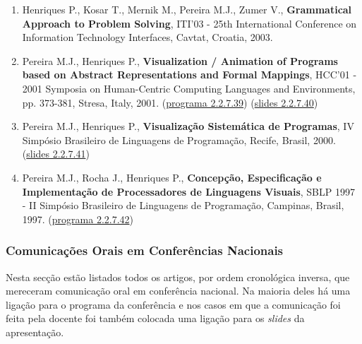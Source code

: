 \documentclass[11pt]{article}
\begin{document}
\begin{enumerate}
\item {Henriques P., Kosar T., Mernik M., Pereira M.J., Zumer V., {\bf{ Grammatical Approach to Problem Solving}}, ITI'03 - 25th International Conference on Information Technology Interfaces, Cavtat, Croatia, 2003.}

\item {Pereira M.J., Henriques P., {\bf{ Visualization / Animation of Programs based on Abstract Representations and Formal Mappings}}, HCC'01 - 2001 Symposia on Human-Centric Computing Languages and Environments, pp. 373-381, Stresa, Italy, 2001. (\href{run:ComunicacoesOrais/programas/HCC2001Program.pdf}{programa 2.2.7.39}) (\href{run:ComunicacoesOrais/HCC01apres.pdf}{slides 2.2.7.40})}

\item {Pereira M.J., Henriques P., {\bf{ Visualização Sistemática de Programas}}, IV Simpósio Brasileiro de Linguagens de Programação, Recife, Brasil, 2000. (\href{run:ComunicacoesOrais/SBLP00apres.pdf}{slides 2.2.7.41})}

\item {Pereira M.J., Rocha J., Henriques P., {\bf{ Concepção, Especificação e Implementação de Processadores de Linguagens Visuais}}, SBLP 1997 - II Simpósio Brasileiro de Linguagens de Programação, Campinas, Brasil, 1997. (\href{run:ComunicacoesOrais/programas/SBLP1997.pdf}{programa 2.2.7.42})}

\end{enumerate}


\subsubsection{Comunicações Orais em Conferências Nacionais}

Nesta secção estão listados todos os artigos, por ordem cronológica inversa, que mereceram comunicação oral em conferência nacional.  Na maioria deles há uma ligação para o programa da conferência e nos casos em que a comunicação foi feita pela docente foi também colocada uma ligação para os {\em{ slides}} da apresentação.
\end{document}
